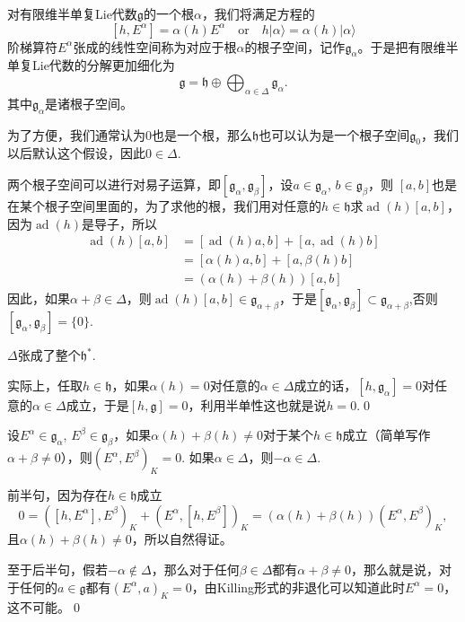 \documentclass[10pt]{article}
\newcommand{\lag}{{\mathfrak{g}}}
\DeclareMathOperator{\ad}{ad}
\begin{document}
\para 对有限维半单复Lie代数$\lag$的一个根$\alpha$，我们将满足方程的
\[
	[h,E^\alpha]=\alpha(h)E^\alpha\quad\text{or}\quad h|\alpha\rangle=\alpha(h)|\alpha\rangle
\]
阶梯算符$E^\alpha$张成的线性空间称为对应于根$\alpha$的根子空间，记作$\lag_{\alpha}$。于是把有限维半单复Lie代数的分解更加细化为
\[
	\lag=\mathfrak{h}\oplus \bigoplus_{\alpha\in\Delta} \lag_\alpha.
\]
其中$\lag_\alpha$是诸根子空间。

为了方便，我们通常认为$0$也是一个根，那么$\mathfrak{h}$也可以认为是一个根子空间$\lag_0$，我们以后默认这个假设，因此$0\in\Delta$.

\para 两个根子空间可以进行对易子运算，即$[\lag_\alpha,\lag_\beta]$，设$a\in\lag_\alpha$, $b\in\lag_\beta$，则
$[a,b]$也是在某个根子空间里面的，为了求他的根，我们用对任意的$h\in \mathfrak{h}$求$\ad(h)[a,b]$，因为$\ad(h)$是导子，所以
\[
	\begin{split}
		\ad(h)[a,b]&=[\ad(h)a,b]+[a,\ad(h)b]\\
		&=[\alpha(h)a,b]+[a,\beta(h)b]\\
		&=(\alpha(h)+\beta(h))[a,b]
	\end{split}
\]
因此，如果$\alpha+\beta\in\Delta$，则$\ad(h)[a,b]\in \lag_{\alpha+\beta}$，于是$[\lag_\alpha,\lag_\beta]\subset \lag_{\alpha+\beta}$,否则$[\lag_\alpha,\lag_\beta]=\{0\}$.

\pro $\Delta$张成了整个$\mathfrak{h}^*$.

\proof 实际上，任取$h\in \mathfrak{h}$，如果$\alpha(h)=0$对任意的$\alpha\in \Delta$成立的话，$[h,\lag_{\alpha}]=0$对任意的$\alpha\in \Delta$成立，于是$[h,\lag]=0$，利用半单性这也就是说$h=0$.\qed

\pro 设$E^\alpha\in\lag_\alpha$, $E^\beta\in\lag_\beta$，如果$\alpha(h)+\beta(h)\neq 0$对于某个$h\in \mathfrak{h}$成立（简单写作$\alpha+\beta\neq 0$），则$(E^\alpha,E^\beta)_K=0$. 如果$\alpha\in\Delta$，则$-\alpha\in\Delta$.

\proof 前半句，因为存在$h\in\mathfrak{h}$成立
\[
	0=([h,E^\alpha],E^\beta)_K+(E^\alpha,[h,E^\beta])_K=(\alpha(h)+\beta(h))(E^\alpha,E^\beta)_K,
\]
且$\alpha(h)+\beta(h)\neq 0$，所以自然得证。

至于后半句，假若$-\alpha\notin\Delta$，那么对于任何$\beta\in\Delta$都有$\alpha+\beta\neq 0$，那么就是说，对于任何的$a\in \lag$都有$(E^\alpha,a)_K=0$，由Killing形式的非退化可以知道此时$E^\alpha=0$，这不可能。\qed

\end{document}

